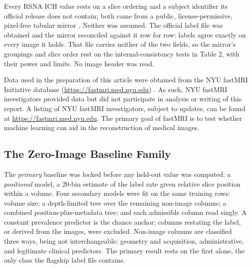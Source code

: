 \documentclass[11pt,letterpaper]{article}
\begin{document}
Every RSNA ICH value rests on a slice ordering and a subject identifier its
official release does not contain; both came from a public, license-permissive,
pixel-free tabular mirror \citep{burduja2020ich}. Neither was assumed. The
official label file was obtained and the mirror reconciled against it row for
row: labels agree exactly on every image it holds. That file carries neither of
the two fields, so the mirror's groupings and slice order rest on the
internal-consistency tests in Table 2, with their power and limits. No image
header was read.

Data used in the preparation of this article were obtained from the NYU fastMRI
Initiative database (\url{https://fastmri.med.nyu.edu})
\citep{knoll2020fastmri,zbontar2018fastmri}. As such, NYU fastMRI investigators
provided data but did not participate in analysis or writing of this report. A
listing of NYU fastMRI investigators, subject to updates, can be found at
\url{https://fastmri.med.nyu.edu}. The primary goal of fastMRI is to test
whether machine learning can aid in the reconstruction of medical images.

\subsection*{The Zero-Image Baseline Family}

The \emph{primary} baseline was locked before any held-out value was computed: a
\emph{positional} model, a 20-bin estimate of the label rate given relative slice
position within a volume. Four secondary models were fit on the same training
rows: volume size; a depth-limited tree over the remaining non-image columns; a
combined position-plus-metadata tree; and each admissible column read singly. A
constant prevalence predictor is the chance anchor; columns restating the label,
or derived from the images, were excluded. Non-image columns are classified three
ways, being not interchangeable: geometry and acquisition, administrative, and
legitimate clinical predictors. The primary result rests on the first alone, the
only class the flagship label file contains.
\end{document}
